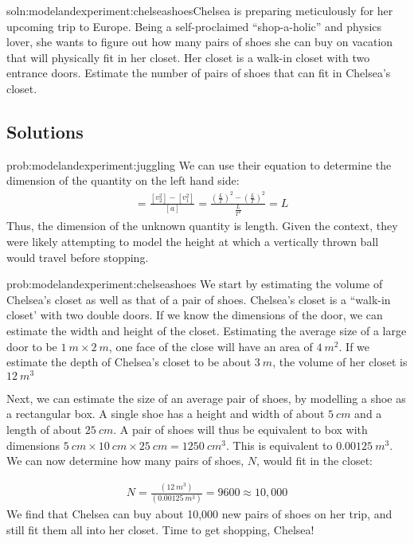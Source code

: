 \begin{problem}{soln:modelandexperiment:chelseashoes}{\label{prob:modelandexperiment:chelseashoes}Chelsea is preparing meticulously for her upcoming trip to Europe. Being a self-proclaimed ``shop-a-holic'' and physics lover, she wants to figure out how many pairs of shoes she can buy on vacation that will physically fit in her closet. Her closet is a walk-in closet with two entrance doors. Estimate the number of pairs of shoes that can fit in Chelsea's closet.}
\end{problem}

\subsection{Solutions}

\begin{solution}{prob:modelandexperiment:juggling}\label{soln:modelandexperiment:juggling}
We can use their equation to determine the dimension of the quantity on the left hand side:
\begin{align*}
[?]&=\frac{[v_2^{2}]-[v_1^{2}]}{[a]}=\frac{\left(\frac{L}{T}\right)^{2}-\left(\frac{L}{T}\right)^2}{\frac{L}{T^{2}}}= L
\end{align*}
Thus, the dimension of the unknown quantity is length. Given the context, they were likely attempting to model the height at which a vertically thrown ball would travel before stopping.\end{solution}

\begin{solution}{prob:modelandexperiment:chelseashoes}\label{soln:modelandexperiment:chelseashoes}
We start by estimating the volume of Chelsea's closet as well as that of a pair of shoes. Chelsea's closet is a ``walk-in closet' with two double doors. If we know the dimensions of the door, we can estimate the width and height of the closet. Estimating the average size of a large door to be $\SI{1}{m}\times \SI{2}{m}$, one face of the close will have an area of $\SI{4}{m^2}$. If we estimate the depth of Chelsea's closet to be about $\SI{3}{m}$, the volume of her closet is $\SI{12}{m^3}$

Next, we can estimate the size of an average pair of shoes, by modelling a shoe as a rectangular box. A single shoe has a height and width of about $\SI{5}{cm}$ and a length of about $\SI{25}{cm}$. A pair of shoes will thus be equivalent to box with dimensions $\SI{5}{cm} \times \SI{10}{cm} \times \SI{25}{cm} = \SI{1250}{cm^3}$. This is equivalent to $\SI{0.00125}{m^3}$. We can now determine how many pairs of shoes, $N$, would fit in the closet:

\begin{align*}
N=\frac{(\SI{12}{m^3})}{(\SI{0.00125}{m^3})}= 9600\approx 10,000 
\end{align*}
We find that Chelsea can buy about 10,000 new pairs of shoes on her trip, and still fit them all into her closet. Time to get shopping, Chelsea!
\end{solution}
